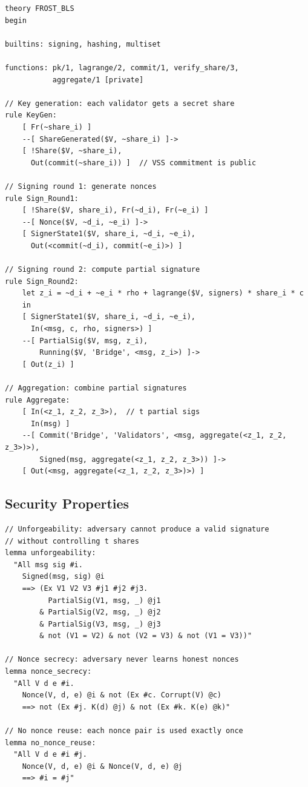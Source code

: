 \begin{lstlisting}[language=Tamarin,caption={FROST-BLS key generation in Tamarin}]
theory FROST_BLS
begin

builtins: signing, hashing, multiset

functions: pk/1, lagrange/2, commit/1, verify_share/3,
           aggregate/1 [private]

// Key generation: each validator gets a secret share
rule KeyGen:
    [ Fr(~share_i) ]
    --[ ShareGenerated($V, ~share_i) ]->
    [ !Share($V, ~share_i),
      Out(commit(~share_i)) ]  // VSS commitment is public

// Signing round 1: generate nonces
rule Sign_Round1:
    [ !Share($V, share_i), Fr(~d_i), Fr(~e_i) ]
    --[ Nonce($V, ~d_i, ~e_i) ]->
    [ SignerState1($V, share_i, ~d_i, ~e_i),
      Out(<commit(~d_i), commit(~e_i)>) ]

// Signing round 2: compute partial signature
rule Sign_Round2:
    let z_i = ~d_i + ~e_i * rho + lagrange($V, signers) * share_i * c
    in
    [ SignerState1($V, share_i, ~d_i, ~e_i),
      In(<msg, c, rho, signers>) ]
    --[ PartialSig($V, msg, z_i),
        Running($V, 'Bridge', <msg, z_i>) ]->
    [ Out(z_i) ]

// Aggregation: combine partial signatures
rule Aggregate:
    [ In(<z_1, z_2, z_3>),  // t partial sigs
      In(msg) ]
    --[ Commit('Bridge', 'Validators', <msg, aggregate(<z_1, z_2, z_3>)>),
        Signed(msg, aggregate(<z_1, z_2, z_3>)) ]->
    [ Out(<msg, aggregate(<z_1, z_2, z_3>)>) ]
\end{lstlisting}

\subsection{Security Properties}

\begin{lstlisting}[language=Tamarin,caption={FROST-BLS security properties}]
// Unforgeability: adversary cannot produce a valid signature
// without controlling t shares
lemma unforgeability:
  "All msg sig #i.
    Signed(msg, sig) @i
    ==> (Ex V1 V2 V3 #j1 #j2 #j3.
          PartialSig(V1, msg, _) @j1
        & PartialSig(V2, msg, _) @j2
        & PartialSig(V3, msg, _) @j3
        & not (V1 = V2) & not (V2 = V3) & not (V1 = V3))"

// Nonce secrecy: adversary never learns honest nonces
lemma nonce_secrecy:
  "All V d e #i.
    Nonce(V, d, e) @i & not (Ex #c. Corrupt(V) @c)
    ==> not (Ex #j. K(d) @j) & not (Ex #k. K(e) @k)"

// No nonce reuse: each nonce pair is used exactly once
lemma no_nonce_reuse:
  "All V d e #i #j.
    Nonce(V, d, e) @i & Nonce(V, d, e) @j
    ==> #i = #j"
\end{lstlisting}


